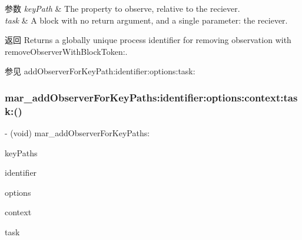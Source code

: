 \begin{DoxyParams}{参数}
{\em key\+Path} & The property to observe, relative to the reciever. \\
\hline
{\em task} & A block with no return argument, and a single parameter\+: the reciever. \\
\hline
\end{DoxyParams}
\begin{DoxyReturn}{返回}
Returns a globally unique process identifier for removing observation with remove\+Observer\+With\+Block\+Token\+:. 
\end{DoxyReturn}
\begin{DoxySeeAlso}{参见}
add\+Observer\+For\+Key\+Path\+:identifier\+:options\+:task\+: 
\end{DoxySeeAlso}
\mbox{\label{category_n_s_object_07_m_a_r___observer_08_a5291491c0cc3e6242e336641ec834dff}} 
\subsubsection{\texorpdfstring{mar\+\_\+add\+Observer\+For\+Key\+Paths\+:identifier\+:options\+:context\+:task\+:()}{mar\_addObserverForKeyPaths:identifier:options:context:task:()}}
{\footnotesize\ttfamily -\/ (void) mar\+\_\+add\+Observer\+For\+Key\+Paths\+: \begin{DoxyParamCaption}\item[{(N\+S\+Array $\ast$)}]{key\+Paths }\item[{identifier:(N\+S\+String $\ast$)}]{identifier }\item[{options:(N\+S\+Key\+Value\+Observing\+Options)}]{options }\item[{context:(B\+K\+Observer\+Context)}]{context }\item[{task:(id)}]{task }\end{DoxyParamCaption}\hspace{0.3cm}{\ttfamily [implementation]}}

